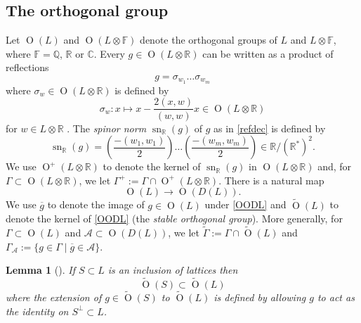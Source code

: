 \documentclass[12pt, a4paper]{article}
\newtheorem{lemma}[theorem]{Lemma}
\newcommand{\RR}{\mathbb{R}}
\newcommand{\CC}{\mathbb{C}}
\newcommand{\QQ}{\mathbb{Q}}
\newcommand{\FF}{\mathbb{F}}
\newcommand{\beq}{\begin{equation*}}
\newcommand{\eeq}{\end{equation*}}
\newcommand{\Ac}{\mathcal{A}}
\newcommand{\opn}{\operatorname}
\begin{document}
\subsection{The orthogonal group}
Let $\opn{O}(L)$ and $\opn{O}(L \otimes \FF)$ denote the orthogonal groups of $L$ and $L \otimes \FF$, where $\FF = \QQ$, $\RR$ or $\CC$.
Every $g \in \opn{O}(L \otimes \RR)$ can be written as a product of reflections  
\begin{equation}\label{refdec}
g = \sigma_{w_1} \ldots \sigma_{w_m}
\end{equation}
where $\sigma_w \in \opn{O}(L \otimes \RR)$ is defined by
\beq
\sigma_w: x \mapsto x - \frac{2(x,w)}{(w,w)}x \in \opn{O}(L \otimes \RR)
\eeq
for $w \in L \otimes \RR$ \cite{cassels}.
The \emph{spinor norm} $\opn{sn}_{\RR}(g)$ of $g$ as in \eqref{refdec} is defined by \cite{Kneser}
\begin{equation}\label{spinordef}
  \opn{sn}_{\RR}(g) =
  \left ( \frac{-(w_1, w_1)}{2} \right )
  \ldots
    \left ( \frac{-(w_m, w_m)}{2} \right )
\in \RR/(\RR^*)^2.
\end{equation}
We use $\opn{O}^+(L \otimes \RR)$ to denote the kernel of $\opn{sn}_{\RR}(g)$ in $\opn{O}(L \otimes \RR)$ and, for  $\Gamma \subset \opn{O}(L \otimes \RR)$, we let $\Gamma^+:=\Gamma \cap \opn{O}^+(L \otimes \RR)$.
There is a natural map 
\begin{equation}\label{OODL}
\opn{O}(L) \rightarrow \opn{O}(D(L)).
\end{equation}
We use $\overline{g}$ to denote the image of $g \in \opn{O}(L)$ under \eqref{OODL} and $\widetilde{\opn{O}}(L)$ to denote the kernel of \eqref{OODL} (the \emph{stable orthogonal group}). 
More generally, for $\Gamma \subset \opn{O}(L)$ and $\Ac \subset \opn{O}(D(L))$, we let
$\widetilde{\Gamma} := \Gamma \cap \widetilde{\opn{O}}(L)$
and
$\Gamma_{\Ac} := \{ g \in \Gamma \mid \overline{g} \in \Ac \}$.
\begin{lemma}[{\hspace{1sp}\cite[Lemma 7.1]{handbook}}]\label{stabext}
  If $S \subset L$ is an inclusion of lattices then 
\beq
\widetilde{\opn{O}}(S) \subset \widetilde{\opn{O}}(L)
\eeq
where the extension of $g \in \widetilde{\opn{O}}(S)$ to $\widetilde{\opn{O}}(L)$ is defined by allowing $g$ to act as the identity on $S^{\perp} \subset L$.
\end{lemma}
\end{document}
